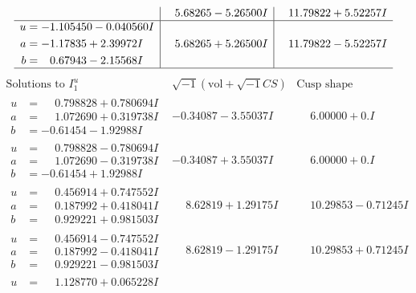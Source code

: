 \documentclass[1p]{elsarticle_modified}
\theoremstyle{definition}
\newcommand{\I}{\sqrt{-1}}
\begin{document}
$$\begin{array}{c|c|c}
 & \phantom{-}5.68265 - 5.26500 I & \phantom{-}11.79822 + 5.52257 I \\ \hline\begin{aligned}
u &= -1.105450 - 0.040560 I \\
a &= -1.17835 + 2.39972 I \\
b &= \phantom{-}0.67943 - 2.15568 I\end{aligned}
 & \phantom{-}5.68265 + 5.26500 I & \phantom{-}11.79822 - 5.52257 I\\
 \hline 
 \end{array}$$\newpage$$\begin{array}{c|c|c}  
\text{Solutions to }I^u_{1}& \I (\text{vol} + \sqrt{-1}CS) & \text{Cusp shape}\\
 \hline 
\begin{aligned}
u &= \phantom{-}0.798828 + 0.780694 I \\
a &= \phantom{-}1.072690 + 0.319738 I \\
b &= -0.61454 - 1.92988 I\end{aligned}
 & -0.34087 - 3.55037 I & \phantom{-}6.00000 + 0. I\phantom{ +0.000000I} \\ \hline\begin{aligned}
u &= \phantom{-}0.798828 - 0.780694 I \\
a &= \phantom{-}1.072690 - 0.319738 I \\
b &= -0.61454 + 1.92988 I\end{aligned}
 & -0.34087 + 3.55037 I & \phantom{-}6.00000 + 0. I\phantom{ +0.000000I} \\ \hline\begin{aligned}
u &= \phantom{-}0.456914 + 0.747552 I \\
a &= \phantom{-}0.187992 + 0.418041 I \\
b &= \phantom{-}0.929221 + 0.981503 I\end{aligned}
 & \phantom{-}8.62819 + 1.29175 I & \phantom{-}10.29853 - 0.71245 I \\ \hline\begin{aligned}
u &= \phantom{-}0.456914 - 0.747552 I \\
a &= \phantom{-}0.187992 - 0.418041 I \\
b &= \phantom{-}0.929221 - 0.981503 I\end{aligned}
 & \phantom{-}8.62819 - 1.29175 I & \phantom{-}10.29853 + 0.71245 I \\ \hline\begin{aligned}
u &= \phantom{-}1.128770 + 0.065228 I \\

\end{aligned}
\end{array}$$
\end{document}
